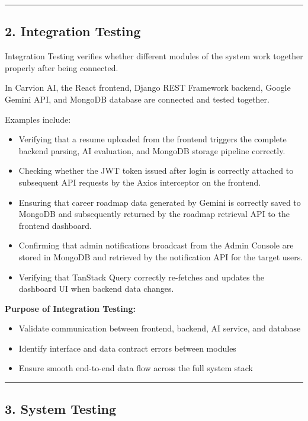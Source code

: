 \documentclass[12pt]{article}
\begin{document}
\noindent\rule{\textwidth}{0.4pt}

\subsection{2. Integration Testing}

Integration Testing verifies whether different modules of the system work together properly after being connected.

In Carvion AI, the React frontend, Django REST Framework backend, Google Gemini API, and MongoDB database are connected and tested together.

Examples include:

\begin{itemize}
  \item Verifying that a resume uploaded from the frontend triggers the complete backend parsing, AI evaluation, and MongoDB storage pipeline correctly.
  \item Checking whether the JWT token issued after login is correctly attached to subsequent API requests by the Axios interceptor on the frontend.
  \item Ensuring that career roadmap data generated by Gemini is correctly saved to MongoDB and subsequently returned by the roadmap retrieval API to the frontend dashboard.
  \item Confirming that admin notifications broadcast from the Admin Console are stored in MongoDB and retrieved by the notification API for the target users.
  \item Verifying that TanStack Query correctly re-fetches and updates the dashboard UI when backend data changes.
\end{itemize}

\textbf{Purpose of Integration Testing:}

\begin{itemize}
  \item Validate communication between frontend, backend, AI service, and database
  \item Identify interface and data contract errors between modules
  \item Ensure smooth end-to-end data flow across the full system stack
\end{itemize}

\noindent\rule{\textwidth}{0.4pt}

\subsection{3. System Testing}
\end{document}
